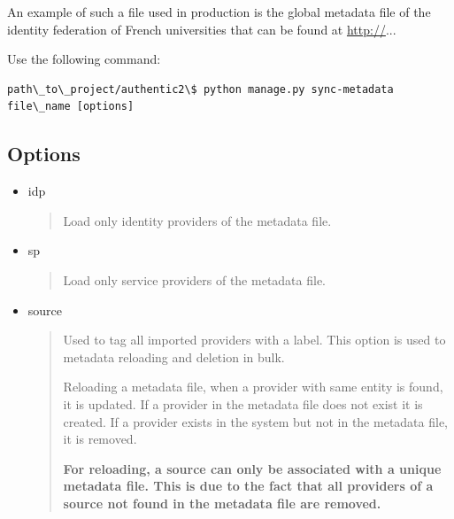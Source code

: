 \documentclass[letterpaper,10pt,english]{sphinxmanual}
\begin{document}
An example of such a file used in production is the global metadata file of
the identity federation of French universities that can be found at \href{http://}{http://}...

Use the following command:

\begin{Verbatim}[commandchars=\\\{\}]
path\_to\_project/authentic2\$ python manage.py sync-metadata file\_name [options]
\end{Verbatim}


\subsection{Options}
\label{sync-metadata_script:options}\begin{itemize}
\item {} 
idp
\begin{quote}

Load only identity providers of the metadata file.
\end{quote}

\item {} 
sp
\begin{quote}

Load only service providers of the metadata file.
\end{quote}

\item {} 
source
\begin{quote}

Used to tag all imported providers with a label. This option is used to
metadata reloading and deletion in bulk.

Reloading a metadata file, when a provider with same entity is found, it is
updated. If a provider in the metadata file does not exist it is created.
If a provider exists in the system but not in the metadata file, it is
removed.

\textbf{For reloading, a source can only be associated with a unique metadata
file. This is due to the fact that all providers of a source not found in
the metadata file are removed.}
\end{quote}

\end{itemize}
\end{document}
